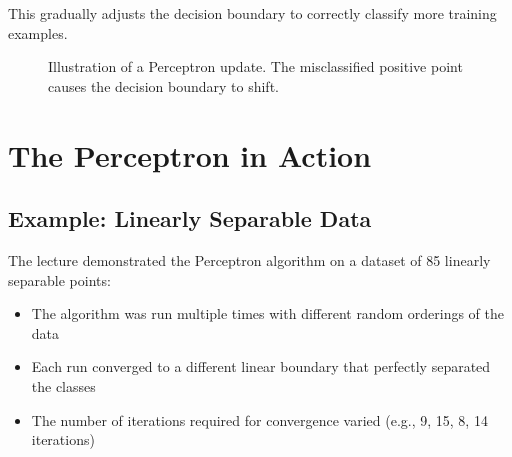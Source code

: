 \documentclass{article}
\begin{document}
This gradually adjusts the decision boundary to correctly classify more training examples.

\begin{figure}[h]
\centering
{}
\caption{Illustration of a Perceptron update. The misclassified positive point causes the decision boundary to shift.}
\end{figure}

\section{The Perceptron in Action}

\subsection{Example: Linearly Separable Data}
The lecture demonstrated the Perceptron algorithm on a dataset of 85 linearly separable points:
\begin{itemize}
    \item The algorithm was run multiple times with different random orderings of the data
    \item Each run converged to a different linear boundary that perfectly separated the classes
    \item The number of iterations required for convergence varied (e.g., 9, 15, 8, 14 iterations)
\end{itemize}
\end{document}
